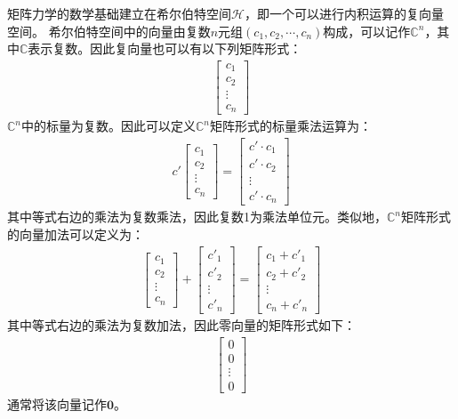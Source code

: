 矩阵力学的数学基础建立在希尔伯特空间\(\mathcal{H}\)，即一个可以进行内积运算的复向量空间。
希尔伯特空间中的向量由复数\(n\)元组\(\left(c_1,c_2,\cdots,c_n\right)\)构成，可以记作\(\mathbb{C}^n\)，其中\(\mathbb{C}\)表示复数。因此复向量也可以有以下列矩阵形式：
\begin{align}
    \left[\begin{matrix}
        c_1\\c_2\\\vdots\\c_n
    \end{matrix}\right]
\end{align}
\(\mathbb{C}^n\)中的标量为复数。因此可以定义\(\mathbb{C}^n\)矩阵形式的标量乘法运算为：
\begin{align}
    c'\left[\begin{matrix}
        c_1\\c_2\\\vdots\\c_n
    \end{matrix}\right]=\left[\begin{matrix}
        c'\cdot c_1\\c'\cdot c_2\\\vdots\\c'\cdot c_n
    \end{matrix}\right]
\end{align}
其中等式右边的乘法为复数乘法，因此复数1为乘法单位元。类似地，\(\mathbb{C}^n\)矩阵形式的向量加法可以定义为：
\begin{align}
    \left[\begin{matrix}
        c_1\\c_2\\\vdots\\c_n
    \end{matrix}\right]
    +\left[\begin{matrix}
        c'_1\\c'_2\\\vdots\\c'_n
    \end{matrix}\right]=\left[\begin{matrix}
        c_1+c'_1\\c_2+c'_2\\\vdots\\c_n+c'_n
    \end{matrix}\right]
\end{align}
其中等式右边的乘法为复数加法，因此零向量的矩阵形式如下：
\begin{align}
    \left[\begin{matrix}
        0\\0\\\vdots\\0
    \end{matrix}\right]
\end{align}
通常将该向量记作\(\mathbf{0}\)。

